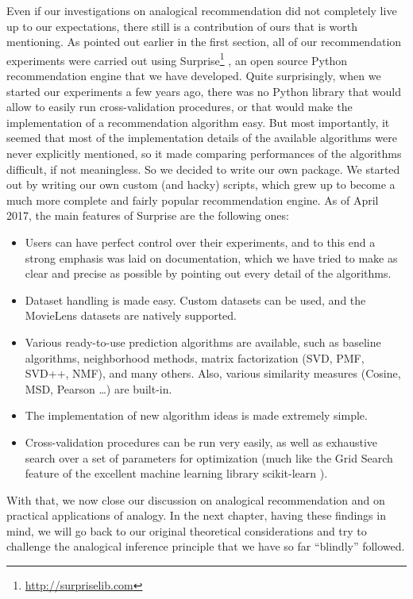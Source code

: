 Even if our investigations on analogical recommendation did not completely live
up to our expectations, there still is a contribution of ours that  is worth
mentioning. As pointed out earlier in the first section, all of our
recommendation experiments
were carried out using Surprise\footnote{\url{http://surpriselib.com}}
\cite{Surprise}, an open source Python recommendation engine that we have
developed. Quite surprisingly, when we started our experiments a few years
ago, there was no Python library that would allow to easily run
cross-validation procedures, or that would make the implementation of a
recommendation algorithm easy. But most importantly, it seemed that most of the
implementation details of the available algorithms were never explicitly
mentioned, so it made comparing performances of the algorithms difficult, if not
meaningless. So we decided to write our own package. We started out by writing
our own custom (and hacky) scripts, which grew up to become a much more
complete and fairly popular recommendation engine. As of April 2017, the main
features of Surprise are the following ones:
\begin{itemize}
  \item Users can have perfect control over their experiments, and to this end
    a strong emphasis was laid on documentation, which we have tried to make as
    clear and precise as possible by pointing out every detail of the
    algorithms.
  \item Dataset handling is made easy. Custom datasets can be used, and the
    MovieLens datasets are natively supported.
  \item Various ready-to-use prediction algorithms are available, such as
    baseline algorithms, neighborhood methods, matrix factorization (SVD,
    PMF, SVD++, NMF), and many others. Also, various similarity measures
    (Cosine, MSD, Pearson \dots) are built-in.
  \item The implementation of new algorithm ideas is made extremely simple.
  \item Cross-validation procedures can be run very easily, as well as
    exhaustive search over a set of parameters for optimization (much like the
    Grid Search feature of the excellent machine learning library scikit-learn
    \cite{scikit-learn}).\\
\end{itemize}

With that, we now close our discussion on analogical recommendation and on
practical applications of analogy. In the next chapter, having these findings
in mind, we will go back to our original theoretical considerations and try to
challenge the analogical inference principle that we have so far ``blindly''
followed.
